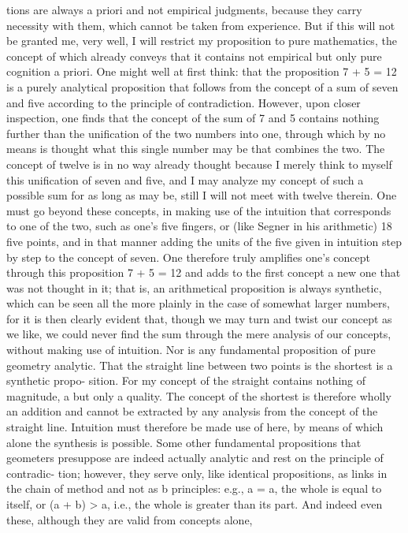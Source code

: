 tions are always a priori and not empirical judgments, because they carry
necessity with them, which cannot be taken from experience. But if this
will not be granted me, very well, I will restrict my proposition to pure
mathematics, the concept of which already conveys that it contains not
empirical but only pure cognition a priori.
One might well at ﬁrst think: that the proposition 7 + 5 = 12 is a
purely analytical proposition that follows from the concept of a sum
of seven and ﬁve according to the principle of contradiction. However,
upon closer inspection, one ﬁnds that the concept of the sum of 7 and
5 contains nothing further than the uniﬁcation of the two numbers into
one, through which by no means is thought what this single number may
be that combines the two. The concept of twelve is in no way already
thought because I merely think to myself this uniﬁcation of seven and
ﬁve, and I may analyze my concept of such a possible sum for as long as
may be, still I will not meet with twelve therein. One must go beyond
these concepts, in making use of the intuition that corresponds to one of
the two, such as one’s ﬁve ﬁngers, or (like Segner in his arithmetic) 18 ﬁve
points, and in that manner adding the units of the ﬁve given in intuition
step by step to the concept of seven. One therefore truly ampliﬁes one’s
concept through this proposition 7 + 5 = 12 and adds to the ﬁrst concept
a new one that was not thought in it; that is, an arithmetical proposition
is always synthetic, which can be seen all the more plainly in the case
of somewhat larger numbers, for it is then clearly evident that, though
we may turn and twist our concept as we like, we could never ﬁnd the
sum through the mere analysis of our concepts, without making use of
intuition.
Nor is any fundamental proposition of pure geometry analytic. That
the straight line between two points is the shortest is a synthetic propo-
sition. For my concept of the straight contains nothing of magnitude, a
but only a quality. The concept of the shortest is therefore wholly an
addition and cannot be extracted by any analysis from the concept of the
straight line. Intuition must therefore be made use of here, by means of
which alone the synthesis is possible.
Some other fundamental propositions that geometers presuppose
are indeed actually analytic and rest on the principle of contradic-
tion; however, they serve only, like identical propositions, as links in
the chain of method and not as b principles: e.g., a = a, the whole is
equal to itself, or (a + b) > a, i.e., the whole is greater than its part.
And indeed even these, although they are valid from concepts alone,
